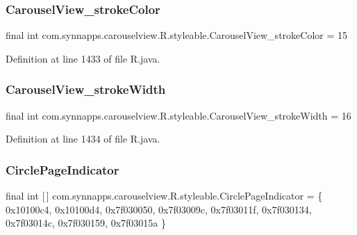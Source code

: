 \subsubsection{\texorpdfstring{CarouselView\_strokeColor}{CarouselView\_strokeColor}}
{\footnotesize\ttfamily final int com.\+synnapps.\+carouselview.\+R.\+styleable.\+Carousel\+View\+\_\+stroke\+Color = 15\hspace{0.3cm}{\ttfamily [static]}}



Definition at line 1433 of file R.\+java.

\mbox{\label{classcom_1_1synnapps_1_1carouselview_1_1_r_1_1styleable_af070221c6eb0d450a2c1a2d47f61f028}} 
\subsubsection{\texorpdfstring{CarouselView\_strokeWidth}{CarouselView\_strokeWidth}}
{\footnotesize\ttfamily final int com.\+synnapps.\+carouselview.\+R.\+styleable.\+Carousel\+View\+\_\+stroke\+Width = 16\hspace{0.3cm}{\ttfamily [static]}}



Definition at line 1434 of file R.\+java.

\mbox{\label{classcom_1_1synnapps_1_1carouselview_1_1_r_1_1styleable_a8c18432822057b47827072fa40111a75}} 
\subsubsection{\texorpdfstring{CirclePageIndicator}{CirclePageIndicator}}
{\footnotesize\ttfamily final int \mbox{[}$\,$\mbox{]} com.\+synnapps.\+carouselview.\+R.\+styleable.\+Circle\+Page\+Indicator = \{ 0x10100c4, 0x10100d4, 0x7f030050, 0x7f03009c, 0x7f03011f, 0x7f030134, 0x7f03014c, 0x7f030159, 0x7f03015a \}\hspace{0.3cm}{\ttfamily [static]}}



